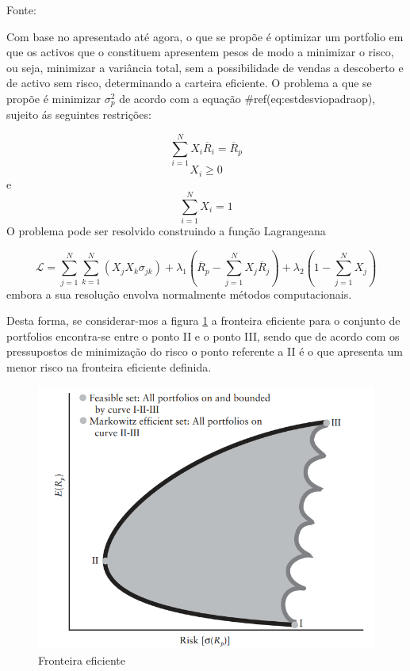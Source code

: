 \documentclass[
  12pt,
  a4paper,
  openany]{book}
\begin{document}
Fonte: \citep[pp.58]{Goetzmann2014}

\justifying
\bigskip

Com base no apresentado até agora, o que se propõe é optimizar um portfolio em que os activos que o constituem apresentem pesos de modo a minimizar o risco, ou seja, minimizar a variância total, sem a possibilidade de vendas a descoberto e de activo sem risco, determinando a carteira eficiente. O problema a que se propõe é minimizar \(\sigma_{p}^{2}\) de acordo com a equação \#ref(eq:estdesviopadraop), sujeito ás seguintes restrições:

\begin{equation} 
  \sum_{i=1}^{N}X_{i}\overline{R}_{i}=\overline{R}_{p}
  \label{eq:und}
\end{equation}
\[X_{i}\geq0\] e \[\sum_{i=1}^{N}X_{i}=1\]
O problema pode ser resolvido construindo a função Lagrangeana

\begin{equation} 
  \mathcal{L} = \sum_{j=1}^{N}\sum_{k=1}^{N}(X_{j}X_{k}\sigma_{jk})+\lambda_{1}(\overline{R}_{p}-\sum_{j=1}^{N}X_{j}\overline{R}_{j})+\lambda_{2}(1-\sum_{j=1}^{N}X_{j})
  \label{eq:estdesviopadraop}
\end{equation}
embora a sua resolução envolva normalmente métodos computacionais.

Desta forma, se considerar-mos a figura \ref{fig:eficient} a fronteira eficiente para o conjunto de portfolios encontra-se entre o ponto II e o ponto III, sendo que de acordo com os pressupostos de minimização do risco o ponto referente a II é o que apresenta um menor risco na fronteira eficiente definida.



\begin{figure}

{\centering \includegraphics[width=0.6\linewidth]{image/eficient} 

}

\caption{Fronteira eficiente}\label{fig:eficient}
\end{figure}
\FloatBarrier
\centering
\end{document}
